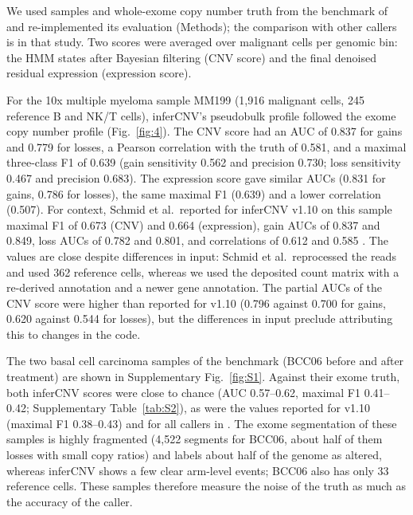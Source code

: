 We used samples and whole-exome copy number truth from the benchmark of \citet{schmid2025} and re-implemented its evaluation (Methods); the comparison with other callers is in that study. Two scores were averaged over malignant cells per genomic bin: the HMM states after Bayesian filtering (CNV score) and the final denoised residual expression (expression score).


For the 10x multiple myeloma sample MM199 (1,916 malignant cells, 245 reference B and NK/T cells), inferCNV's pseudobulk profile followed the exome copy number profile (Fig.~\ref{fig:4}). The CNV score had an AUC of 0.837 for gains and 0.779 for losses, a Pearson correlation with the truth of 0.581, and a maximal three-class F1 of 0.639 (gain sensitivity 0.562 and precision 0.730; loss sensitivity 0.467 and precision 0.683). The expression score gave similar AUCs (0.831 for gains, 0.786 for losses), the same maximal F1 (0.639) and a lower correlation (0.507). For context, Schmid et al.~reported for inferCNV v1.10 on this sample maximal F1 of 0.673 (CNV) and 0.664 (expression), gain AUCs of 0.837 and 0.849, loss AUCs of 0.782 and 0.801, and correlations of 0.612 and 0.585 \citep{schmid2025}. The values are close despite differences in input: Schmid et al.~reprocessed the reads and used 362 reference cells, whereas we used the deposited count matrix with a re-derived annotation and a newer gene annotation. The partial AUCs of the CNV score were higher than reported for v1.10 (0.796 against 0.700 for gains, 0.620 against 0.544 for losses), but the differences in input preclude attributing this to changes in the code.

The two basal cell carcinoma samples of the benchmark (BCC06 before and after treatment) are shown in Supplementary Fig.~\ref{fig:S1}. Against their exome truth, both inferCNV scores were close to chance (AUC 0.57--0.62, maximal F1 0.41--0.42; Supplementary Table~\ref{tab:S2}), as were the values reported for v1.10 (maximal F1 0.38--0.43) and for all callers in \citet{schmid2025}. The exome segmentation of these samples is highly fragmented (4,522 segments for BCC06, about half of them losses with small copy ratios) and labels about half of the genome as altered, whereas inferCNV shows a few clear arm-level events; BCC06 also has only 33 reference cells. These samples therefore measure the noise of the truth as much as the accuracy of the caller.

